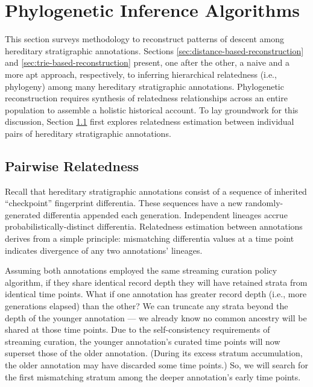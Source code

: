 \section{Phylogenetic Inference Algorithms} \label{sec:reconstruction-algorithm}

This section surveys methodology to reconstruct patterns of descent among hereditary stratigraphic annotations.  %
Sections \ref{sec:distance-based-reconstruction} and \ref{sec:trie-based-reconstruction} present, one after the other, a naive and a more apt approach, respectively, to inferring hierarchical relatedness (i.e., phylogeny) among many hereditary stratigraphic annotations.
Phylogenetic reconstruction requires synthesis of relatedness relationships across an entire population to assemble a holistic historical account.  %
To lay groundwork for this discussion, Section \ref{sec:pairwise-relatedness} first explores relatedness estimation between individual pairs of hereditary stratigraphic annotations.

\subsection{Pairwise Relatedness}
\label{sec:pairwise-relatedness}

Recall that hereditary stratigraphic annotations consist of a sequence of inherited ``checkpoint'' fingerprint differentia.
These sequences have a new randomly-generated differentia appended each generation.
Independent lineages accrue probabilistically-distinct differentia.
Relatedness estimation between annotations derives from a simple principle: mismatching differentia values at a time point indicates divergence of any two annotations' lineages.

Assuming both annotations employed the same streaming curation policy algorithm, if they share identical record depth they will have retained strata from identical time points.
What if one annotation has greater record depth (i.e., more generations elapsed) than the other?
We can truncate any strata beyond the depth of the younger annotation --- we already know no common ancestry will be shared at those time points.
Due to the self-consistency requirements of streaming curation, the younger annotation's curated time points will now superset those of the older annotation.
(During its excess stratum accumulation, the older annotation may have discarded some time points.)
So, we will search for the first mismatching stratum among the deeper annotation's early time points.

